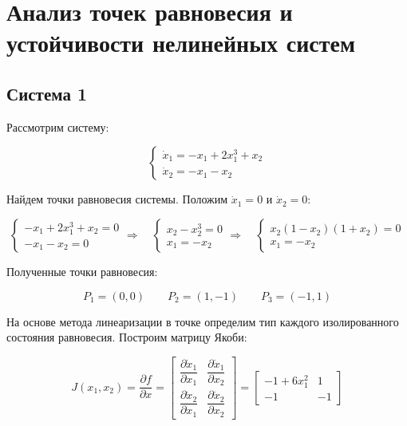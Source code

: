 \documentclass[a4paper,12pt]{article}
\begin{document}
\newpage \section{Анализ точек равновесия и устойчивости нелинейных систем}

\subsection{Система 1}

Рассмотрим систему:

\begin{equation} \label{sys:task1_1}
	\begin{cases}
		\dot{x}_1 = -x_1 + 2x_1^3 + x_2 \\
		\dot{x}_2 = -x_1 - x_2
	\end{cases}
\end{equation}

Найдем точки равновесия системы. Положим \(\dot{x}_1 = 0 \text{ и } \dot{x}_2 = 0\):

\[
\begin{cases}
	-x_1 + 2x_1^3 +x_2 = 0 \\
	-x_1 - x_2 = 0
\end{cases} 
\Longrightarrow \quad
\begin{cases}
	x_2 -x_2^3 = 0 \\
	x_1 = - x_2
\end{cases}
\Longrightarrow \quad
\begin{cases}
	x_2 (1-x_2)(1+x_2)= 0 \\
	x_1 = - x_2
\end{cases}
\]

Полученные точки равновесия:

\[
P_1 = (0, 0) \qquad P_2 = (1, -1) \qquad P_3 = (-1, 1) 
\]

На основе метода линеаризации в точке определим тип каждого изолированного состояния равновесия. Построим матрицу Якоби:

\[
J(x_1, x_2) = \frac{\partial f}{\partial x} = 
\begin{bmatrix}
	\dfrac{\partial \dot{x}_1}{\partial x_1} & \dfrac{\partial \dot{x}_1}{\partial x_2} \\[10pt]
	\dfrac{\partial \dot{x}_2}{\partial x_1} & \dfrac{\partial \dot{x}_2}{\partial x_2}
\end{bmatrix} = 
\begin{bmatrix}
	-1 + 6x_1^2 & 1 \\
	-1 & -1
\end{bmatrix}
\]
\end{document}
